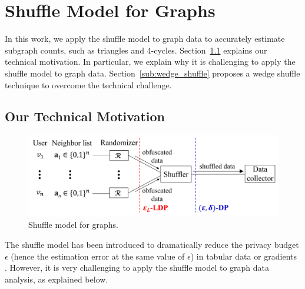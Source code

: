 \section{Shuffle Model for Graphs}
\label{sec:shuffle}
In this work, we apply the shuffle model to graph data to accurately estimate subgraph counts, such as triangles and 4-cycles. 
Section~\ref{sub:technical} explains our technical motivation. 
In particular, we explain why it is challenging to apply the shuffle model to graph data. 
Section~\ref{sub:wedge_shuffle} proposes a wedge shuffle technique to overcome the technical challenge. 

\subsection{Our Technical Motivation}
\label{sub:technical}

\begin{figure}[t]
  \centering
  \includegraphics[width=0.99\linewidth]{fig/shuffle.pdf}
  \vspace{-2mm}
  \caption{Shuffle model for graphs. 
  }
  \label{fig:shuffle_model}
\end{figure}

The shuffle model has been introduced to dramatically reduce the privacy budget $\epsilon$ (hence the estimation error at the same value of $\epsilon$) in tabular data \cite{Wang_PVLDB20} or 
gradients 
\cite{Girgis_AISTATS21,Liu_AAAI21}. 
However, it is very challenging to apply the shuffle model to graph data analysis, as explained below. 

